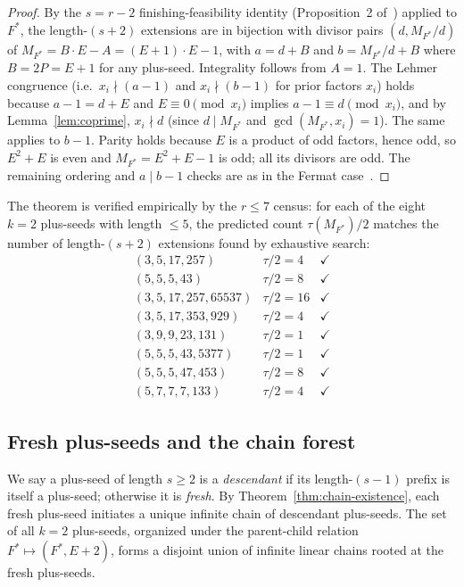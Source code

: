 \documentclass[11pt]{article}
\theoremstyle{definition}
\theoremstyle{remark}
\begin{document}
\begin{proof}
By the $s = r - 2$ finishing-feasibility identity (Proposition~2
of~\cite{Mfinish}) applied to $F^*$, the length-$(s+2)$ extensions
are in bijection with divisor pairs $(d, M_{F^*}/d)$ of $M_{F^*} =
B \cdot E - A = (E+1) \cdot E - 1$, with $a = d + B$ and $b =
M_{F^*}/d + B$ where $B = 2P = E + 1$ for any plus-seed.
Integrality follows from $A = 1$.  The Lehmer congruence (i.e.\
$x_i \nmid (a - 1)$ and $x_i \nmid (b - 1)$ for prior factors $x_i$)
holds because $a - 1 = d + E$ and $E \equiv 0 \pmod{x_i}$ implies
$a - 1 \equiv d \pmod{x_i}$, and by Lemma~\ref{lem:coprime},
$x_i \nmid d$ (since $d \mid M_{F^*}$ and $\gcd(M_{F^*}, x_i) = 1$).
The same applies to $b - 1$.  Parity holds because $E$ is a product
of odd factors, hence odd, so $E^2 + E$ is even and $M_{F^*} = E^2 +
E - 1$ is odd; all its divisors are odd.  The remaining ordering and
$a \mid b - 1$ checks are as in the Fermat
case~\cite[Theorem~3]{Mfinish}.
\end{proof}

The theorem is verified empirically by the $r \le 7$ census: for each
of the eight $k = 2$ plus-seeds with length $\le 5$, the predicted
count $\tau(M_{F^*}) / 2$ matches the number of length-$(s+2)$
extensions found by exhaustive search:
\[
  \begin{array}{lll}
  (3, 5, 17, 257)              & \tau / 2 = 4  & \checkmark \\
  (5, 5, 5, 43)                & \tau / 2 = 8  & \checkmark \\
  (3, 5, 17, 257, 65537)        & \tau / 2 = 16 & \checkmark \\
  (3, 5, 17, 353, 929)          & \tau / 2 = 4  & \checkmark \\
  (3, 9, 9, 23, 131)            & \tau / 2 = 1  & \checkmark \\
  (5, 5, 5, 43, 5377)           & \tau / 2 = 1  & \checkmark \\
  (5, 5, 5, 47, 453)            & \tau / 2 = 8  & \checkmark \\
  (5, 7, 7, 7, 133)             & \tau / 2 = 4  & \checkmark
  \end{array}
\]

\subsection{Fresh plus-seeds and the chain forest}

We say a plus-seed of length $s \ge 2$ is a \emph{descendant} if its
length-$(s-1)$ prefix is itself a plus-seed; otherwise it is
\emph{fresh}.  By Theorem~\ref{thm:chain-existence}, each fresh
plus-seed initiates a unique infinite chain of descendant plus-seeds.
The set of all $k = 2$ plus-seeds, organized under the parent-child
relation $F^* \mapsto (F^*, E + 2)$, forms a disjoint union of
infinite linear chains rooted at the fresh plus-seeds.
\end{document}
